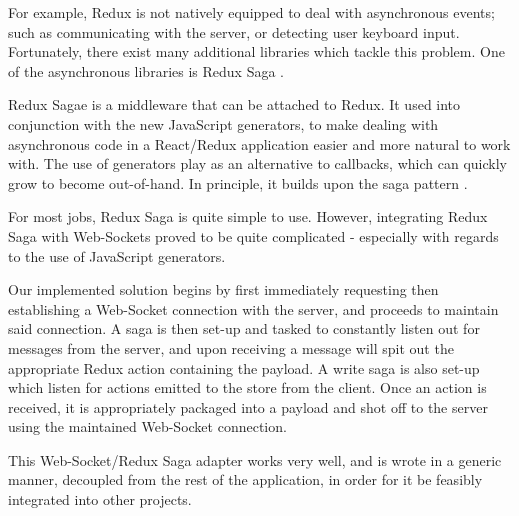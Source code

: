 \documentclass{standalone}
\begin{document}
				For example, Redux is not natively equipped to deal with asynchronous events; such as communicating with the server, or detecting user keyboard input. Fortunately, there exist many additional libraries which tackle this problem. One of the asynchronous libraries is Redux Saga \parencite{reduxSaga}.

				Redux Sagae is a middleware that can be attached to Redux. It used into conjunction with the new JavaScript generators, to make dealing with asynchronous code in a React/Redux application easier and more natural to work with. The use of generators play as an alternative to callbacks, which can quickly grow to become out-of-hand. In principle, it builds upon the saga pattern \parencite{sagas}.

				For most jobs, Redux Saga is quite simple to use. However, integrating Redux Saga with Web-Sockets proved to be quite complicated - especially with regards to the use of JavaScript generators.

				Our implemented solution begins by first immediately requesting then establishing a Web-Socket connection with the server, and proceeds to maintain said connection. A saga is then set-up and tasked to constantly listen out for messages from the server, and upon receiving a message will spit out the appropriate Redux action containing the payload. A write saga is also set-up which listen for actions emitted to the store from the client. Once an action is received, it is appropriately packaged into a payload and shot off to the server using the maintained Web-Socket connection.

				This Web-Socket/Redux Saga adapter works very well, and is wrote in a generic manner, decoupled from the rest of the application, in order for it be feasibly integrated into other projects.
\end{document}
